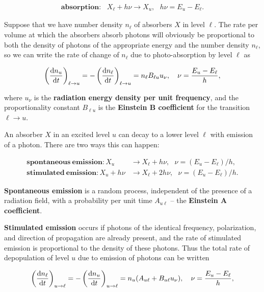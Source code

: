 \documentclass[a4paper,10pt]{article}
\begin{document}
\begin{align*}
    \mathbf{absorption:} ~~~ X_\ell+h\nu\rightarrow X_u, ~~~ h\nu=E_u-E_\ell.
\end{align*}

{\noindent}Suppose that we have number density $n_\ell$ of absorbers $X$ in level $\ell$. The rate per volume at which the absorbers absorb photons will obviously be proportional to both the density of photons of the appropriate energy and the number density $n_\ell$, so we can write the rate of change of $n_\ell$ due to photo-absorption by level $\ell$ as

\begin{align*}
    \left(\frac{{\rm d}n_u}{{\rm d}t}\right)_{\ell\rightarrow u} = -\left(\frac{{\rm d}n_\ell}{{\rm d}t}\right)_{\ell\rightarrow u} = n_\ell B_{\ell u}u_\nu, ~~~ \nu=\frac{E_u-E_\ell}{h},
\end{align*}

{\noindent}where $u_\nu$ is the \textbf{radiation energy density per unit frequency}, and the proportionality constant $B_{\ell u}$ is the \textbf{Einstein B coefficient} for the transition $\ell\rightarrow u$.

{\noindent}An absorber $X$ in an excited level $u$ can decay to a lower level $\ell$ with emission of a photon. There are two ways this can happen:

\begin{align*}
    \mathbf{spontaneous~emission:} X_u&\rightarrow X_\ell+h\nu, ~~~ \nu=(E_u-E_\ell)/h, \\
    \mathbf{stimulated~emission:} X_u+h\nu&\rightarrow X_\ell+2h\nu, ~~~ \nu=(E_u-E_\ell)/h.
\end{align*}

{\noindent}\textbf{Spontaneous emission} is a random process, independent of the presence of a radiation field, with a probability per unit time $A_{u\ell}$ -- the \textbf{Einstein A coefficient}.

{\noindent}\textbf{Stimulated emission} occurs if photons of the identical frequency, polarization, and direction of propagation are already present, and the rate of stimulated emission is proportional to the density of these photons. Thus the total rate of depopulation of level $u$ due to emission of photons can be written

\begin{align*}
    \left(\frac{{\rm d}n_\ell}{{\rm d}t}\right)_{u\rightarrow\ell} = -\left(\frac{{\rm d}n_u}{{\rm d}t}\right)_{u\rightarrow\ell} = n_u(A_{u\ell}+B_{u\ell}u_\nu), ~~~ \nu=\frac{E_u-E_\ell}{h},
\end{align*}
\end{document}
